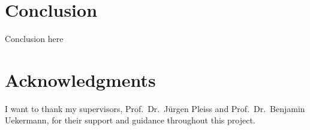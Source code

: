 \documentclass[lettersize,journal]{IEEEtran}
\begin{document}
 \section{Conclusion}\label{sec:conclusion} %

Conclusion here



\section*{Acknowledgments}
I want to thank my supervisors, Prof.\ Dr.\ Jürgen Pleiss and Prof.\ Dr.\ Benjamin Uekermann, for their support and guidance throughout this project.


 
 





%
%

%
\end{document}
